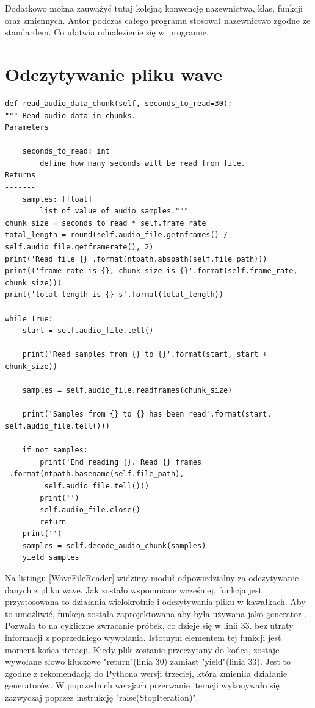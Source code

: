 \documentclass[eng,printmode]{mgr}
\begin{document}
Dodatkowo można zauważyć tutaj kolejną konwencję nazewnictwa, klas, funkcji oraz zmiennych. Autor podczas całego programu stosował nazewnictwo zgodne ze standardem\newline\cite{PEP8}. Co ułatwia odnalezienie się w~programie.


\section{Odczytywanie pliku wave}
\begin{minipage}{\linewidth}
\begin{lstlisting}[caption={fragment kodu źródłowego pliku WaveFileReader.py},captionpos=b,label={WaveFileReader}]
def read_audio_data_chunk(self, seconds_to_read=30):
""" Read audio data in chunks.
Parameters
----------
    seconds_to_read: int
        define how many seconds will be read from file.
Returns
-------
    samples: [float]
        list of value of audio samples."""
chunk_size = seconds_to_read * self.frame_rate
total_length = round(self.audio_file.getnframes() / self.audio_file.getframerate(), 2)
print('Read file {}'.format(ntpath.abspath(self.file_path)))
print(('frame rate is {}, chunk size is {}'.format(self.frame_rate, chunk_size)))
print('total length is {} s'.format(total_length))

while True:
    start = self.audio_file.tell()

    print('Read samples from {} to {}'.format(start, start + chunk_size))
                                             
    samples = self.audio_file.readframes(chunk_size)

    print('Samples from {} to {} has been read'.format(start, self.audio_file.tell()))

    if not samples:
        print('End reading {}. Read {} frames '.format(ntpath.basename(self.file_path),
         self.audio_file.tell()))
        print('')
        self.audio_file.close()
        return
    print('')
    samples = self.decode_audio_chunk(samples)
    yield samples
\end{lstlisting}
\end{minipage}
Na listingu \ref{WaveFileReader} widzimy moduł odpowiedzialny za odczytywanie danych z pliku wave. Jak zostało wspomniane wcześniej, funkcja jest przystosowana to działania wielokrotnie i odczytywania pliku w kawałkach. Aby to umożliwić, funkcja została zaprojektowana aby była używana jako generator \cite{Generator}. Pozwala to na cykliczne zwracanie próbek, co dzieje się w linii 33. bez utraty informacji z poprzedniego wywołania. Istotnym elementem tej funkcji jest moment końca iteracji. Kiedy plik zostanie przeczytany do końca, zostaje wywołane słowo kluczowe "return"(linia 30) zamiast "yield"(linia 33). Jest to zgodne z rekomendacją do Pythona wersji trzeciej, \cite{return} która zmieniła działanie generatorów. W poprzednich wersjach przerwanie iteracji wykonywało się zazwyczaj poprzez instrukcję "raise(StopIteration)". 
\end{document}
